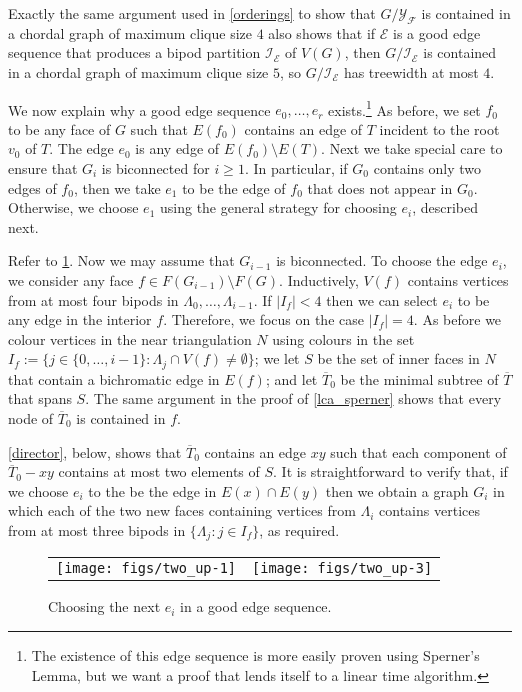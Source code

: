 \documentclass{patmorin}
\begin{document}
Exactly the same argument used in \cref{orderings} to show that $G/\mathcal{Y_F}$ is contained in a chordal graph of maximum clique size $4$ also shows that if $\mathcal{E}$ is a good edge sequence that produces a bipod partition $\mathcal{I_E}$ of $V(G)$, then $G/\mathcal{I_E}$ is contained in a chordal graph of maximum clique size $5$, so $G/\mathcal{I_E}$ has treewidth at most $4$.

We now explain why a good edge sequence $e_0,\ldots,e_r$ exists.\footnote{The existence of this edge sequence is more easily proven using Sperner's Lemma, but we want a proof that lends itself to a linear time algorithm.}  As before, we set $f_0$ to be any face of $G$ such that $E(f_0)$ contains an edge of $T$ incident to the root $v_0$ of $T$.  The edge $e_0$ is any edge of $E(f_0)\setminus E(T)$.  Next we take special care to ensure that $G_i$ is biconnected for $i\ge 1$.  In particular, if $G_0$ contains only two edges of $f_0$, then we take $e_1$ to be the edge of $f_0$ that does not appear in $G_0$.  Otherwise, we choose $e_1$ using the general strategy for choosing $e_i$, described next.

Refer to \cref{e_i}.  Now we may assume that $G_{i-1}$ is biconnected. To choose the edge $e_i$, we consider any face $f\in F(G_{i-1})\setminus F(G)$. Inductively, $V(f)$ contains vertices from at most four bipods in $\Lambda_0,\ldots,\Lambda_{i-1}$. If $|I_f| < 4$ then we can select $e_i$ to be any edge in the interior $f$. Therefore, we focus on the case $|I_f| = 4$. As before we colour vertices in the near triangulation $N$ using colours in the set $I_f:=\{j\in\{0,\ldots,i-1\}:\Lambda_j\cap V(f)\neq\emptyset\}$; we let $S$ be the set of inner faces in $N$ that contain a bichromatic edge in $E(f)$; and let $\overline{T}_0$ be the minimal subtree of $\overline{T}$ that spans $S$.  The same argument in the proof of \cref{lca_sperner} shows that every node of $\overline{T}_0$ is contained in $f$.

\cref{director}, below, shows that $\overline{T}_0$ contains an edge $xy$ such that each component of $\overline{T}_0-xy$ contains at most two elements of $S$.  It is straightforward to verify that, if we choose $e_i$ to the be the edge in $E(x)\cap E(y)$ then we obtain a graph $G_i$ in which each of the two new faces containing vertices from $\Lambda_i$ contains vertices from at most three bipods in $\{\Lambda_j:j\in I_f\}$, as required.

\begin{figure}[htbp]
  \begin{center}
    \begin{tabular}{cc}
       \texttt{[image: figs/two\_up-1]} &
       \texttt{[image: figs/two\_up-3]}
     \end{tabular}
  \end{center}
  \caption{Choosing the next $e_i$ in a  good edge sequence.}
  \label{e_i}
\end{figure}
\end{document}
